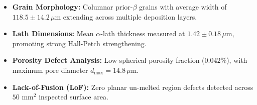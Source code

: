 \documentclass[10pt,a4paper,parskip=half]{scrartcl}
\begin{document}
\noindent
\begin{minipage}[t]{0.48\textwidth}
\begin{tcolorbox}[title={\faMicroscope\ SEM Microstructure Features}, colframe=brandprimary, colback=white, left=5pt, right=5pt, top=3pt, bottom=3pt]
\small
\begin{itemize}[leftmargin=*, label=\textcolor{brandsecondary}{\small\faCheck}]
    \item \textbf{Grain Morphology:} Columnar prior-$\beta$ grains with average width of $118.5 \pm 14.2\,\mu\text{m}$ extending across multiple deposition layers.
    \item \textbf{Lath Dimensions:} Mean $\alpha$-lath thickness measured at $1.42 \pm 0.18\,\mu\text{m}$, promoting strong Hall-Petch strengthening.
    \item \textbf{Porosity Defect Analysis:} Low spherical porosity fraction ($0.042\%$), with maximum pore diameter $d_{\text{max}} = 14.8\,\mu\text{m}$.
    \item \textbf{Lack-of-Fusion (LoF):} Zero planar un-melted region defects detected across $50\text{ mm}^2$ inspected surface area.
\end{itemize}
\end{tcolorbox}
\end{minipage}%
\hfill
\end{document}
